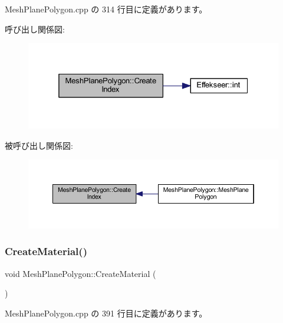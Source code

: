  Mesh\+Plane\+Polygon.\+cpp の 314 行目に定義があります。

呼び出し関係図\+:\nopagebreak
\begin{figure}[H]
\begin{center}
\leavevmode
\includegraphics[width=325pt]{class_mesh_plane_polygon_ae7067eb849977a12554633e604806f85_cgraph}
\end{center}
\end{figure}
被呼び出し関係図\+:\nopagebreak
\begin{figure}[H]
\begin{center}
\leavevmode
\includegraphics[width=350pt]{class_mesh_plane_polygon_ae7067eb849977a12554633e604806f85_icgraph}
\end{center}
\end{figure}
\mbox{\label{class_mesh_plane_polygon_aea5b128def1dae8f391b80be25172b36}} 
\subsubsection{\texorpdfstring{Create\+Material()}{CreateMaterial()}}
{\footnotesize\ttfamily void Mesh\+Plane\+Polygon\+::\+Create\+Material (\begin{DoxyParamCaption}{ }\end{DoxyParamCaption})\hspace{0.3cm}{\ttfamily [private]}}



 Mesh\+Plane\+Polygon.\+cpp の 391 行目に定義があります。

